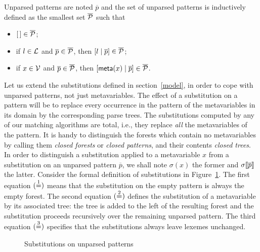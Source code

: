 Unparsed patterns are noted \(\overline{p}\) and the set of unparsed
patterns is inductively defined as the smallest set \(\overline{\cal
  P}\) such that
\begin{itemize}

  \item \(\el \in \overline{\cal P}\);

  \item if \(l \in {\cal L}\) and \(\overline{p} \in \overline{\cal
    P}\), then \(\cons{l}{\overline{p}} \in \overline{\cal P}\);

  \item if \(x \in {\cal V}\) and \(\overline{p} \in \overline{\cal
    P}\), then \(\cons{\meta{x}}{\overline{p}} \in \overline{\cal P}\).

\end{itemize}
Let us extend the substitutions defined in section~\ref{model}, in
order to cope with unparsed patterns, not just meta\-variables. The
effect of a substitution on a pattern will be to replace every
occurrence in the pattern of the meta\-variables in its domain by the
corresponding parse trees. The substitutions computed by any of our
matching algorithms are total, i.e., they replace \emph{all} the
meta\-variables of the pattern. It is handy to distinguish the forests
which contain no meta\-variables by calling them \emph{closed forests}
or \emph{closed patterns}, and their contents \emph{closed trees}. In
order to distinguish a substitution applied to a meta\-variable \(x\)
from a substitution on an unparsed pattern \(\overline{p}\), we shall
note \(\sigma(x)\) the former and \({\sigma}\llbracket{\overline{p}}\rrbracket\) the
latter. Consider the formal definition of substitutions in
Figure~\ref{x_subst_def}.  The first equation \((\stackrel{1}{=})\) means that
the substitution on the empty pattern is always the empty forest. The
second equation \((\stackrel{2}{=})\) defines the substitution of a
meta\-variable by its associated tree: the tree is added to the left
of the resulting forest and the substitution proceeds recursively over
the remaining unparsed pattern. The third equation \((\stackrel{3}{=})\)
specifies that the substitutions always leave lexemes unchanged.
\begin{figure}[t]
\caption{Substitutions on unparsed patterns\label{x_subst_def}}
\end{figure}

